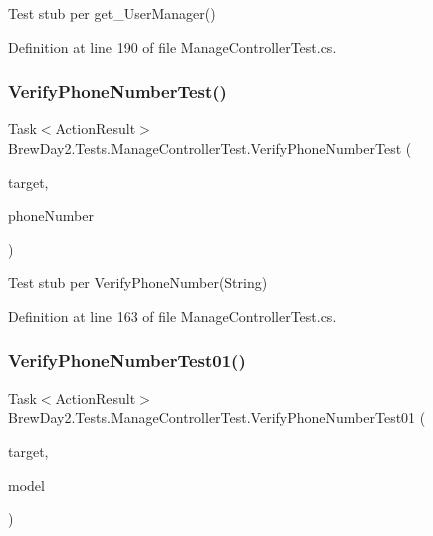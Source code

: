 Test stub per get\+\_\+\+User\+Manager()



Definition at line 190 of file Manage\+Controller\+Test.\+cs.

\mbox{\label{class_brew_day2_1_1_tests_1_1_manage_controller_test_a0e728921fb4497e7ddb27a1bbe918c59}} 
\subsubsection{\texorpdfstring{Verify\+Phone\+Number\+Test()}{VerifyPhoneNumberTest()}}
{\footnotesize\ttfamily Task$<$Action\+Result$>$ Brew\+Day2.\+Tests.\+Manage\+Controller\+Test.\+Verify\+Phone\+Number\+Test (\begin{DoxyParamCaption}\item[{\mbox{[}\+Pex\+Assume\+Under\+Test\mbox{]} \mbox{\hyperlink{class_brew_day2_1_1_controllers_1_1_manage_controller}{Manage\+Controller}}}]{target,  }\item[{string}]{phone\+Number }\end{DoxyParamCaption})}



Test stub per Verify\+Phone\+Number(\+String)



Definition at line 163 of file Manage\+Controller\+Test.\+cs.

\mbox{\label{class_brew_day2_1_1_tests_1_1_manage_controller_test_aafc50666394efb3c470e54a70dd8d63b}} 
\subsubsection{\texorpdfstring{Verify\+Phone\+Number\+Test01()}{VerifyPhoneNumberTest01()}}
{\footnotesize\ttfamily Task$<$Action\+Result$>$ Brew\+Day2.\+Tests.\+Manage\+Controller\+Test.\+Verify\+Phone\+Number\+Test01 (\begin{DoxyParamCaption}\item[{\mbox{[}\+Pex\+Assume\+Under\+Test\mbox{]} \mbox{\hyperlink{class_brew_day2_1_1_controllers_1_1_manage_controller}{Manage\+Controller}}}]{target,  }\item[{\mbox{\hyperlink{class_brew_day2_1_1_models_1_1_verify_phone_number_view_model}{Verify\+Phone\+Number\+View\+Model}}}]{model }\end{DoxyParamCaption})}



